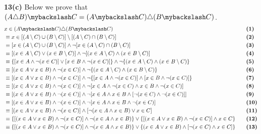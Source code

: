 \textbf{13(c)} Below we prove that $(A \triangle B) \mybackslash C = (A \mybackslash C) \triangle (B \mybackslash C)$.
\begin{alignat*}{2}
& x \in (A \mybackslash C) \triangle (B \mybackslash C) && \quad \textbf{(1)}\\
&\equiv x \in [(A \setminus C) \cup (B \setminus C)] \setminus [(A \setminus C) \cap (B \setminus C)] && \quad \textbf{(2)}\\
&\equiv [x \in (A \setminus C) \cup (B \setminus C)] \wedge \neg [x \in (A \setminus C) \cap (B \setminus C)] && \quad \textbf{(3)}\\
&\equiv [(x \in A \setminus C) \vee  (x \in B \setminus C)] \wedge \neg [(x \in A \setminus C) \wedge (x \in B \setminus C)] && \quad \textbf{(4)}\\
&\equiv \{[x \in A \wedge \neg (x \in C)] \vee  [x \in B \wedge \neg (x \in C)]\} \wedge \neg \{(x \in A \setminus C) \wedge (x \in B \setminus C)\} && \quad \textbf{(5)}\\
&\equiv [(x \in A \vee x \in B) \wedge \neg (x \in C)] \wedge \neg \{(x \in A \setminus C) \wedge (x \in B \setminus C)\} && \quad \textbf{(6)}\\
&\equiv [(x \in A \vee x \in B) \wedge \neg (x \in C)] \wedge \neg \{[x \in A \wedge \neg (x \in C)] \wedge [x \in B \wedge \neg (x \in C)]\} && \quad \textbf{(7)}\\
&\equiv [(x \in A \vee x \in B) \wedge \neg (x \in C)] \wedge \neg [x \in A \wedge \neg (x \in C) \wedge x \in B \wedge \neg (x \in C)] && \quad \textbf{(8)}\\
&\equiv [(x \in A \vee x \in B) \wedge \neg (x \in C)] \wedge \neg [x \in A \wedge x \in B \wedge [\neg (x \in C) \wedge \neg (x \in C)]] && \quad \textbf{(9)}\\
&\equiv [(x \in A \vee x \in B) \wedge \neg (x \in C)] \wedge \neg [x \in A \wedge x \in B \wedge \neg (x \in C)] && \quad \textbf{(10)}\\
&\equiv [(x \in A \vee x \in B) \wedge \neg (x \in C)] \wedge [\neg (x \in A \wedge x \in B) \vee x \in C] && \quad \textbf{(11)}\\
&\equiv \{[(x \in A \vee x \in B) \wedge \neg (x \in C)] \wedge \neg (x \in A \wedge x \in B)\} \vee \{[(x \in A \vee x \in B) \wedge \neg (x \in C)] \wedge x \in C\} && \quad \textbf{(12)}\\
&\equiv \{[(x \in A \vee x \in B) \wedge \neg (x \in C)] \wedge \neg (x \in A \wedge x \in B)\} \vee \{(x \in A \vee x \in B) \wedge [\neg (x \in C) \wedge x \in C]\} && \quad \textbf{(13)}\\

\end{alignat*}
